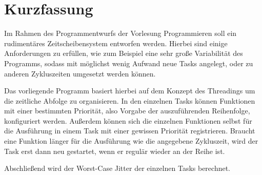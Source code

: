 \chapter*{Kurzfassung} %

Im Rahmen des Programmentwurfs der Vorlesung Programmieren soll ein rudimentäres Zeitscheibensystem entworfen werden.
Hierbei sind einige Anforderungen zu erfüllen, wie zum Beispiel eine sehr große Variabilität des Programms, sodass mit möglichst wenig Aufwand neue Tasks angelegt, oder zu anderen Zykluszeiten umgesetzt werden können. 

Das vorliegende Programm basiert hierbei auf dem Konzept des Threadings um die zeitliche Abfolge zu organisieren. 
In den einzelnen Tasks können Funktionen mit einer bestimmten Priorität, also Vorgabe der auszuführenden Reihenfolge, konfiguriert werden.
Außerdem können sich die einzelnen Funktionen selbst für die Ausführung in einem Task mit einer gewissen Priorität registrieren.
Braucht eine Funktion länger für die Ausführung wie die angegebene Zykluszeit, wird der Task erst dann neu gestartet, wenn er regulär wieder an der Reihe ist.

Abschließend wird der Worst-Case Jitter der einzelnen Tasks berechnet.

\cleardoublepage
